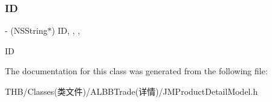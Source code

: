 \subsubsection{\texorpdfstring{ID}{ID}}
{\footnotesize\ttfamily -\/ (N\+S\+String$\ast$) ID\hspace{0.3cm}{\ttfamily [read]}, {\ttfamily [write]}, {\ttfamily [nonatomic]}, {\ttfamily [copy]}}

ID 

The documentation for this class was generated from the following file\+:\begin{DoxyCompactItemize}
\item 
T\+H\+B/\+Classes(类文件)/\+A\+L\+B\+B\+Trade(详情)/J\+M\+Product\+Detail\+Model.\+h\end{DoxyCompactItemize}
